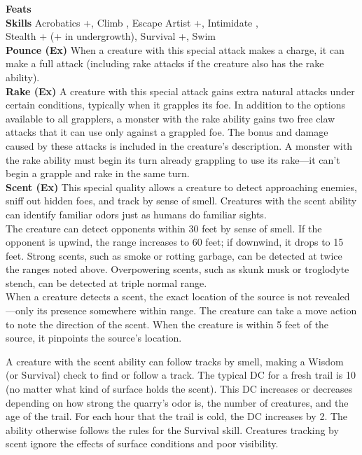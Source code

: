 \textbf{Feats} \feats \\
\textbf{Skills} Acrobatics +\acrobaticsskill, Climb \enhancedstat{+\climbskill}, Escape Artist +\escapeartistskill, Intimidate \intimidateskill, \\ Stealth +\stealthskill \hspace{1pt} (+\undergrowthstealthskill \hspace{1pt} in undergrowth), Survival +\survivalskill, Swim \enhancedstat{+\swimskill} \\

\textbf{Pounce (Ex)} When a creature with this special attack makes a charge, it can make a full attack (including rake attacks if the creature also has the rake ability). \\

\textbf{Rake (Ex)} A creature with this special attack gains extra natural attacks under certain conditions, typically when it grapples its foe. In addition to the options available to all grapplers, a monster with the rake ability gains two free claw attacks that it can use only against a grappled foe. The bonus and damage caused by these attacks is included in the creature’s description. A monster with the rake ability must begin its turn already grappling to use its rake—it can’t begin a grapple and rake in the same turn. \\

\textbf{Scent (Ex)} This special quality allows a creature to detect approaching enemies, sniff out hidden foes, and track by sense of smell. Creatures with the scent ability can identify familiar odors just as humans do familiar sights. \\

The creature can detect opponents within 30 feet by sense of smell. If the opponent is upwind, the range increases to 60 feet; if downwind, it drops to 15 feet. Strong scents, such as smoke or rotting garbage, can be detected at twice the ranges noted above. Overpowering scents, such as skunk musk or troglodyte stench, can be detected at triple normal range. \\

When a creature detects a scent, the exact location of the source is not revealed—only its presence somewhere within range. The creature can take a move action to note the direction of the scent. When the creature is within 5 feet of the source, it pinpoints the source's location. \\

\newpage

A creature with the scent ability can follow tracks by smell, making a Wisdom (or Survival) check to find or follow a track. The typical DC for a fresh trail is 10 (no matter what kind of surface holds the scent). This DC increases or decreases depending on how strong the quarry's odor is, the number of creatures, and the age of the trail. For each hour that the trail is cold, the DC increases by 2. The ability otherwise follows the rules for the Survival skill. Creatures tracking by scent ignore the effects of surface conditions and poor visibility. \\

\newpage
